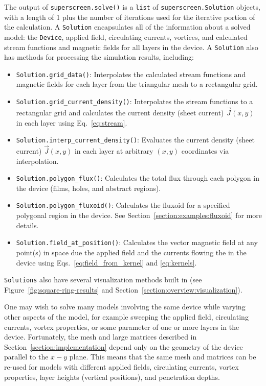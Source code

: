 \documentclass[final,3p,times]{elsarticle}
\newcommand{\inline}[1]{\texttt{#1}\xspace}
\begin{document}
The output of \inline{superscreen.solve()} is a \inline{list} of \inline{superscreen.Solution} objects, with a length of 1 plus the number of iterations used for the iterative portion of the calculation. A \inline{Solution} encapsulates all of the information about a solved model: the \inline{Device}, applied field, circulating currents, vortices, and calculated stream functions and magnetic fields for all layers in the device. A \inline{Solution} also has methods for processing the simulation results, including:
\begin{itemize}
    \item{
    \inline{Solution.grid_data()}: Interpolates the calculated stream functions and magnetic fields for each layer from the triangular mesh to a rectangular grid.
    }
    \item{
    \inline{Solution.grid_current_density()}: Interpolates the stream functions to a rectangular grid and calculates the current density (sheet current) $\vec{J}(x, y)$ in each layer using Eq.~\ref{eq:stream}.
    }
    \item{
    \inline{Solution.interp_current_density()}: Evaluates the current density (sheet current) $\vec{J}(x, y)$ in each layer at arbitrary $(x, y)$ coordinates via interpolation.
    }
    \item{
    \inline{Solution.polygon_flux()}: Calculates the total flux through each polygon in the device (films, holes, and abstract regions).
    }
    \item{
    \inline{Solution.polygon_fluxoid()}: Calculates the fluxoid for a specified polygonal region in the device. See Section~\ref{section:examples:fluxoid} for more details.
    }
    \item{
    \inline{Solution.field_at_position()}: Calculates the vector magnetic field at any point(s) in space due the applied field and the currents flowing the in the device using Eqs.~\ref{eq:field_from_kernel} and \ref{eq:kernels}.
    }
\end{itemize}
\inline{Solutions} also have several visualization methods built in (see Figure~\ref{fig:square-ring-results} and Section~\ref{section:overview:visualization}).

One may wish to solve many models involving the same device while varying other aspects of the model, for example sweeping the applied field, circulating currents, vortex properties, or some parameter of one or more layers in the device. Fortunately, the mesh and large matrices described in Section~\ref{section:implementation} depend only on the geometry of the device parallel to the $x-y$ plane. This means that the same mesh and matrices can be re-used for models with different applied fields, circulating currents, vortex properties, layer heights (vertical positions), and penetration depths.
\end{document}
